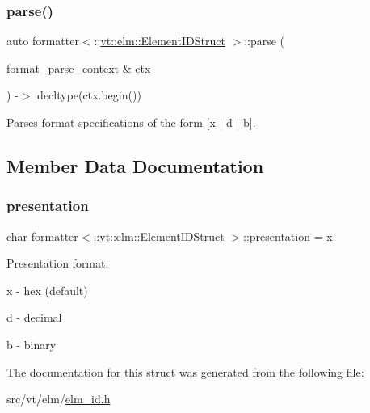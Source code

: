 \subsubsection{\texorpdfstring{parse()}{parse()}}
{\footnotesize\ttfamily auto formatter$<$\+::\hyperlink{structvt_1_1elm_1_1_element_i_d_struct}{vt\+::elm\+::\+Element\+I\+D\+Struct} $>$\+::parse (\begin{DoxyParamCaption}\item[{format\+\_\+parse\+\_\+context \&}]{ctx }\end{DoxyParamCaption}) -\/$>$ decltype(ctx.\+begin()) \hspace{0.3cm}{\ttfamily [inline]}}



Parses format specifications of the form \mbox{[}\textquotesingle{}x\textquotesingle{} $\vert$ \textquotesingle{}d\textquotesingle{} $\vert$ \textquotesingle{}b\textquotesingle{}\mbox{]}. 



\subsection{Member Data Documentation}
\mbox{\label{structformatter_3_1_1vt_1_1elm_1_1_element_i_d_struct_01_4_a0936af81be586aa4e2c4a141cc9ac59b}} 
\subsubsection{\texorpdfstring{presentation}{presentation}}
{\footnotesize\ttfamily char formatter$<$\+::\hyperlink{structvt_1_1elm_1_1_element_i_d_struct}{vt\+::elm\+::\+Element\+I\+D\+Struct} $>$\+::presentation = \textquotesingle{}x\textquotesingle{}}

Presentation format\+:
\begin{DoxyItemize}
\item \textquotesingle{}x\textquotesingle{} -\/ hex (default)
\item \textquotesingle{}d\textquotesingle{} -\/ decimal
\item \textquotesingle{}b\textquotesingle{} -\/ binary 
\end{DoxyItemize}

The documentation for this struct was generated from the following file\+:\begin{DoxyCompactItemize}
\item 
src/vt/elm/\hyperlink{elm__id_8h}{elm\+\_\+id.\+h}\end{DoxyCompactItemize}
